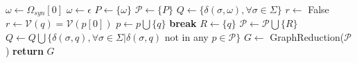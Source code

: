 {\begin{algorithm}
  \caption{$\aleph_0$($\mathcal{S}, \Omega_{syn}$)\label{alg:aleph0}}
    \begin{algorithmic}[1]
      \Procedure{}{}
      		\State $\omega \gets \Omega_{syn}[0]$
      	\Else
      		\State $\omega \gets \epsilon$
      	\EndIf
      	\State $P \gets \{\omega\}$
      	\State $\mathcal{P} \gets \{P\}$
      	\State $Q \gets \{\delta(\sigma,\omega), \forall \sigma \in \Sigma\}$
      		\State $r \gets$ False
      			\State $r \gets \mathcal{V}(q) = \mathcal{V}(p[0])$
      				\State $p \gets p\bigcup\{q\}$
      				\State \textbf{break}
      			\EndIf
      		\EndFor
      			\State $R \gets \{q\}$
      			\State $\mathcal{P} \gets \mathcal{P}\bigcup\{R\}$
      		\EndIf 
      		\State $Q \gets Q\bigcup\{\delta(\sigma,q),\forall \sigma\in\Sigma|\delta(\sigma,q)$ not in any $p\in\mathcal{P}\}$
      	\EndFor
      	\State $G \gets$ GraphReduction($\mathcal{P}$)
      	\State \textbf{return} $G$
      \EndProcedure
    \end{algorithmic}
  \end{algorithm}

}

